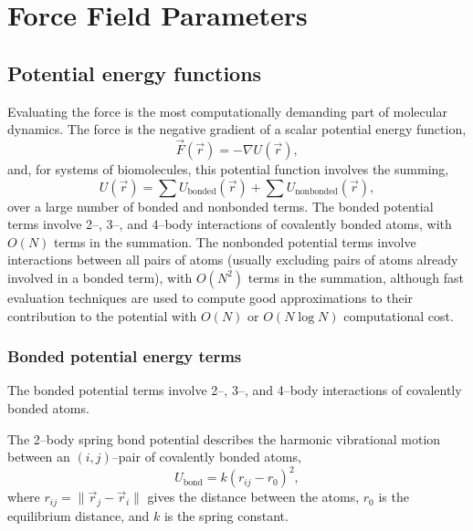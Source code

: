 \section{Force Field Parameters}
\label{section:forcefield}


\subsection{Potential energy functions}

Evaluating the force is the most computationally demanding
part of molecular dynamics.
The force is the negative gradient of a scalar potential energy function,
\begin{equation}
\vec{F}(\vec{r}) = -\nabla U(\vec{r}),
\end{equation}
and, for systems of biomolecules,
this potential function involves the summing,
\begin{equation}
U(\vec{r}) = \sum U_{\text{bonded}}(\vec{r})
  + \sum U_{\text{nonbonded}}(\vec{r}),
\end{equation}
over a large number of bonded and nonbonded terms.
The bonded potential terms involve 2--, 3--, and 4--body interactions
of covalently bonded atoms,
with $O(N)$ terms in the summation.
The nonbonded potential terms involve interactions
between all pairs of atoms
(usually excluding pairs of atoms already involved in a bonded term),
with $O(N^2)$ terms in the summation,
although fast evaluation techniques are used to
compute good approximations to their contribution to the potential
with $O(N)$ or $O(N \log N)$ computational cost.


\subsubsection{Bonded potential energy terms}

The bonded potential terms involve 2--, 3--, and 4--body interactions
of covalently bonded atoms.

The 2--body spring bond potential
describes the harmonic vibrational motion
between an $(i,j)$--pair of covalently bonded atoms,
\begin{equation}
U_{\text{bond}} = k (r_{ij} - r_0)^2,
\end{equation}
where $r_{ij} = \|\vec{r}_j - \vec{r}_i\|$ gives the distance
between the atoms,
$r_0$ is the equilibrium distance,
and $k$ is the spring constant.

